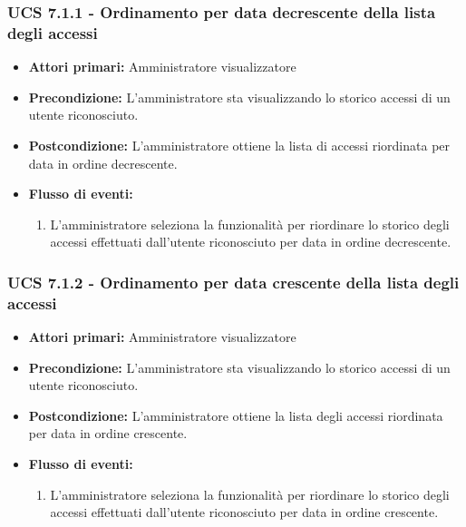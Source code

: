 \subsubsection{UCS 7.1.1 - Ordinamento per data decrescente della lista degli accessi}
\begin{itemize}
	\item \textbf{Attori primari:} Amministratore visualizzatore
	\item \textbf{Precondizione:} L'amministratore sta visualizzando lo storico accessi di un utente riconosciuto.
	\item \textbf{Postcondizione:} L'amministratore ottiene la lista di accessi riordinata per data in ordine decrescente.
	\item \textbf{Flusso di eventi:}
	\begin{enumerate}
		\item L'amministratore seleziona la funzionalità per riordinare lo storico degli accessi effettuati dall'utente riconosciuto per data in ordine decrescente.
	\end{enumerate}
\end{itemize}

\subsubsection{UCS 7.1.2 - Ordinamento per data crescente della lista degli accessi}
\begin{itemize}
	\item \textbf{Attori primari:} Amministratore visualizzatore
	\item \textbf{Precondizione:} L'amministratore sta visualizzando lo storico accessi di un utente riconosciuto.
	\item \textbf{Postcondizione:} L'amministratore ottiene la lista degli accessi riordinata per data in ordine crescente.
	\item \textbf{Flusso di eventi:}
	\begin{enumerate}
		\item L'amministratore seleziona la funzionalità per riordinare lo storico degli accessi effettuati dall'utente riconosciuto per data in ordine crescente.
	\end{enumerate}
\end{itemize}

